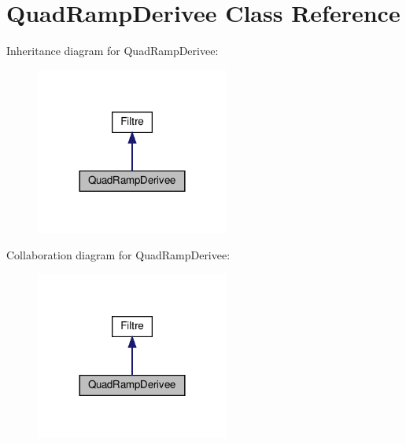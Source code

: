 \hypertarget{classQuadRampDerivee}{}\section{Quad\+Ramp\+Derivee Class Reference}
\label{classQuadRampDerivee}


Inheritance diagram for Quad\+Ramp\+Derivee\+:
\nopagebreak
\begin{figure}[H]
\begin{center}
\leavevmode
\includegraphics[width=180pt]{classQuadRampDerivee__inherit__graph}
\end{center}
\end{figure}


Collaboration diagram for Quad\+Ramp\+Derivee\+:
\nopagebreak
\begin{figure}[H]
\begin{center}
\leavevmode
\includegraphics[width=180pt]{classQuadRampDerivee__coll__graph}
\end{center}
\end{figure}
